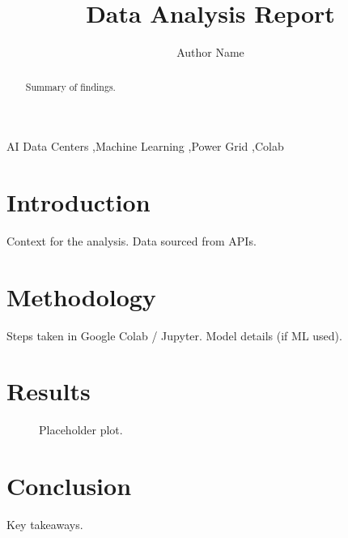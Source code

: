 \documentclass[preprint,12pt]{elsarticle}
\begin{document}
\begin{frontmatter}
\title{Data Analysis Report}

\author[inst1]{Author Name}

\begin{abstract}
Summary of findings.
\end{abstract}

\begin{keyword}
AI Data Centers \sep Machine Learning \sep Power Grid \sep Colab
\end{keyword}
\end{frontmatter}

\section{Introduction}
Context for the analysis. Data sourced from APIs.

\section{Methodology}
Steps taken in Google Colab / Jupyter.
Model details (if ML used).

\section{Results}
\begin{figure}[h]
    \centering
    \caption{Placeholder plot.}
    \label{fig:plot1}
\end{figure}

\section{Conclusion}
Key takeaways.



\end{document}
